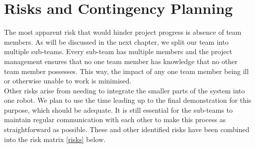 \documentclass[a4paper,10pt,DIV10,openright,openbib]{scrreprt}
\begin{document}
\section{Risks and Contingency Planning}
The most apparent risk that would hinder project progress is absence of team members. 
As will be discussed in the next chapter, we split our team into multiple sub-teams. 
Every sub-team has multiple members and the project management ensures that no 
one team member has knowledge that no other 
team member possesses. This way, the impact of any one team member being ill or 
otherwise unable to work is minimised.\\
Other risks arise from needing to integrate 
the smaller parts of the system into one robot. We plan to use the time leading up to the final demonstration 
for this purpose, which should be adequate. It is still essential for the 
sub-teams to maintain regular communication with each other to make this process
as straightforward as possible. These and other identified risks have been
combined into the risk matrix \ref{risks} below.
\end{document}
